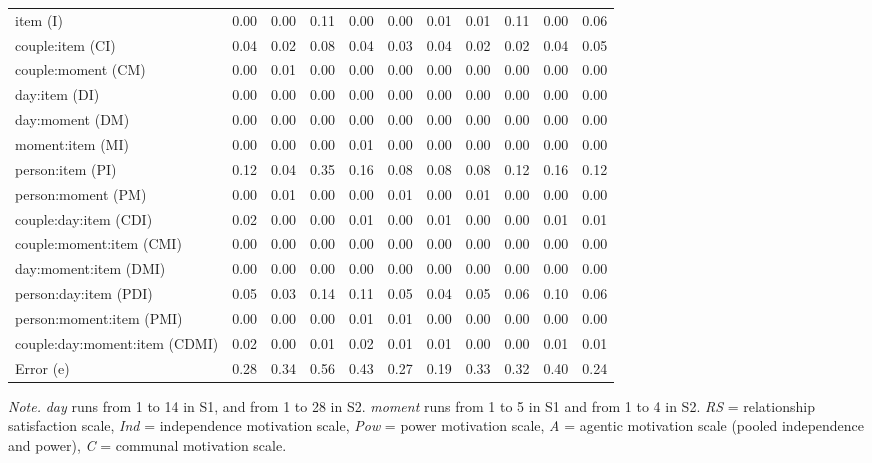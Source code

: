\documentclass[jou,a4paper,draftfirst]{apa6}\usepackage[]{graphicx}\usepackage[]{color}
\begin{document}
\begin{table*}
\begin{threeparttable}
\begin{tabular}{lcccccccccc}
 item (I) & 0.00 & 0.00 & 0.11 & 0.00 & 0.00 & 0.01 & 0.01 & 0.11 & 0.00 & 0.06 \\ 
  couple:item (CI) & 0.04 & 0.02 & 0.08 & 0.04 & 0.03 & 0.04 & 0.02 & 0.02 & 0.04 & 0.05 \\ 
  couple:moment (CM) & 0.00 & 0.01 & 0.00 & 0.00 & 0.00 & 0.00 & 0.00 & 0.00 & 0.00 & 0.00 \\ 
  day:item (DI) & 0.00 & 0.00 & 0.00 & 0.00 & 0.00 & 0.00 & 0.00 & 0.00 & 0.00 & 0.00 \\ 
  day:moment (DM) & 0.00 & 0.00 & 0.00 & 0.00 & 0.00 & 0.00 & 0.00 & 0.00 & 0.00 & 0.00 \\ 
  moment:item (MI) & 0.00 & 0.00 & 0.00 & 0.01 & 0.00 & 0.00 & 0.00 & 0.00 & 0.00 & 0.00 \\ 
  person:item (PI) & 0.12 & 0.04 & 0.35 & 0.16 & 0.08 & 0.08 & 0.08 & 0.12 & 0.16 & 0.12 \\ 
  person:moment (PM) & 0.00 & 0.01 & 0.00 & 0.00 & 0.01 & 0.00 & 0.01 & 0.00 & 0.00 & 0.00 \\ 
  couple:day:item (CDI) & 0.02 & 0.00 & 0.00 & 0.01 & 0.00 & 0.01 & 0.00 & 0.00 & 0.01 & 0.01 \\ 
  couple:moment:item (CMI) & 0.00 & 0.00 & 0.00 & 0.00 & 0.00 & 0.00 & 0.00 & 0.00 & 0.00 & 0.00 \\ 
  day:moment:item (DMI) & 0.00 & 0.00 & 0.00 & 0.00 & 0.00 & 0.00 & 0.00 & 0.00 & 0.00 & 0.00 \\ 
  person:day:item (PDI) & 0.05 & 0.03 & 0.14 & 0.11 & 0.05 & 0.04 & 0.05 & 0.06 & 0.10 & 0.06 \\ 
  person:moment:item (PMI) & 0.00 & 0.00 & 0.00 & 0.01 & 0.01 & 0.00 & 0.00 & 0.00 & 0.00 & 0.00 \\ 
  couple:day:moment:item (CDMI) & 0.02 & 0.00 & 0.01 & 0.02 & 0.01 & 0.01 & 0.00 & 0.00 & 0.01 & 0.01 \\ 
   Error (e) & 0.28 & 0.34 & 0.56 & 0.43 & 0.27 & 0.19 & 0.33 & 0.32 & 0.40 & 0.24 \\ 
  
			
			\midrule
		\end{tabular}
		\begin{tablenotes}[para,flushleft]
			{\small
			\textit{Note.} \emph{day} runs from 1 to 14 in S1, and from 1 to 28 in S2. \emph{moment} runs from 1 to 5 in S1 and from 1 to 4 in S2. \emph{RS} = relationship satisfaction scale, \emph{Ind} = independence motivation scale, \emph{Pow} = power motivation scale, \emph{A} = agentic motivation scale (pooled independence and power), \emph{C} = communal motivation scale.}
	      \end{tablenotes}
	  \end{threeparttable}
\end{table*}	
\end{document}
